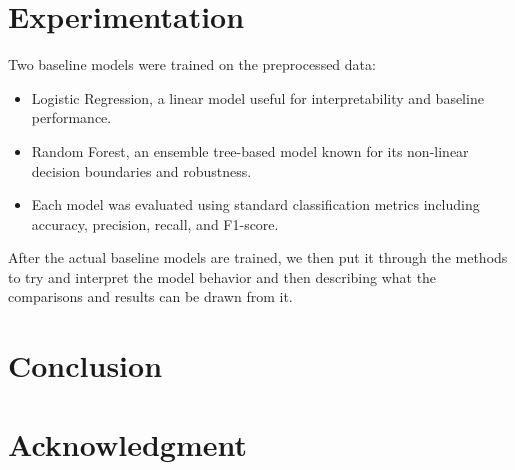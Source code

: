 \documentclass{article}
\begin{document}
\section{Experimentation}
Two baseline models were trained on the preprocessed data:
\begin{itemize}
    \item Logistic Regression, a linear model useful for interpretability and baseline performance.

    \item Random Forest, an ensemble tree-based model known for its non-linear decision boundaries and robustness.

    \item Each model was evaluated using standard classification metrics including accuracy, precision, recall, and F1-score.
\end{itemize}

After the actual baseline models are trained, we then put it through the methods to try and interpret the model behavior and then describing what the comparisons and results can be drawn from it.

\section{Conclusion}

\section*{Acknowledgment}

\author{
    \textbf{Sebastian Mejia} \\
    Role: Wrote the introduction and questioning portion as to why the question is necessary to answer and what the goal would've been. From there, worked on collecting and research about the topic with multiple research papers and presented the plan on how to actually approach the experiment itself.\\
}

\author{
    \textbf{Aditya Dwivedi} \\ 
    Role: Collected datasets from a variety of sectors while making sure that they fit right for the variety that the methods want to be put under stress for. Afterwhich, EDA was performed to understand feature distributions, correlations, handl emissing or imbalanced data to demonstrate the type fo data we're working with. Lastly, the preprocessing section was done by the member to make sure a smooth transition for the code and model portion.\\
}

\author{
    \textbf{Mauricio Monje}\\
    Role: Creating and applying the XAI methods (SHAP and LIME), where SHAP gets the global and local feature importances and LIME to generate local explanations. After the results were generated, we just created an evulations and explanation on how the results affected our main question. \\
}



\cite{slack2021evaluating}      
\cite{sun2023perspective}       
\cite{slack2020fooling}         
\cite{goldwasser2024provably}
\cite{mckinney2025explainbench}
\end{document}
